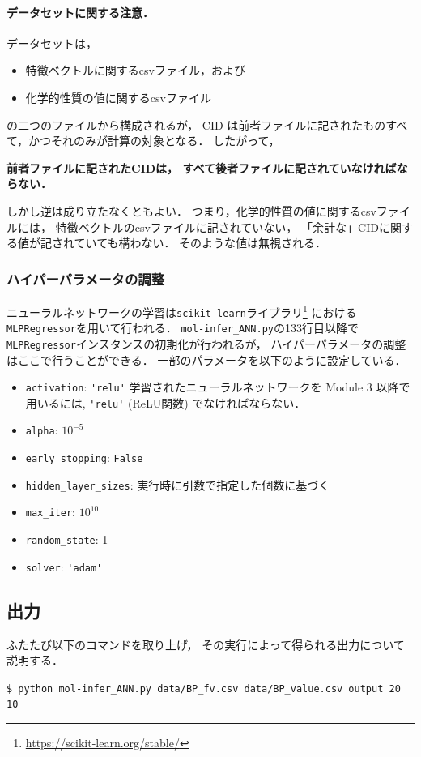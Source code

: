 \documentclass[11pt, titlepage, dvipdfmx, twoside]{jarticle}
\begin{document}
\paragraph{データセットに関する注意．}
データセットは，
\begin{itemize}
\item 特徴ベクトルに関するcsvファイル，および
\item 化学的性質の値に関するcsvファイル
\end{itemize}
の二つのファイルから構成されるが，
CID は前者ファイルに記されたものすべて，かつそれのみが計算の対象となる．
したがって，
\begin{center}
  {\bf 前者ファイルに記されたCIDは，
  すべて後者ファイルに記されていなければならない．}
\end{center}
しかし逆は成り立たなくともよい．
つまり，化学的性質の値に関するcsvファイルには，
特徴ベクトルのcsvファイルに記されていない，
「余計な」CIDに関する値が記されていても構わない．
そのような値は無視される．

\subsubsection{ハイパーパラメータの調整}
ニューラルネットワークの学習は{\tt scikit-learn}ライブラリ\footnote{\url{https://scikit-learn.org/stable/}}
における{\tt MLPRegressor}を用いて行われる．
\verb|mol-infer_ANN.py|の133行目以降で\verb|MLPRegressor|インスタンスの初期化が行われるが，
ハイパーパラメータの調整はここで行うことができる．
一部のパラメータを以下のように設定している．
\begin{itemize}
\item \verb|activation|: \verb|'relu'| {\color{red}{\bf 注意:} 学習されたニューラルネットワークを Module 3 以降で用いるには, \verb|'relu'| (ReLU関数) でなければならない．}
\item \verb|alpha|: $10^{-5}$
\item \verb|early_stopping|: \verb|False|
\item \verb|hidden_layer_sizes|: 実行時に引数で指定した個数に基づく
\item \verb|max_iter|: $10^{10}$
\item \verb|random_state|: 1
\item \verb|solver|: \verb|'adam'|
\end{itemize}

\subsection{出力}
ふたたび以下のコマンドを取り上げ，
その実行によって得られる出力について説明する．
\begin{oframed}
{\small
\verb|$ python mol-infer_ANN.py data/BP_fv.csv data/BP_value.csv output 20 10|
}
\end{oframed}
\end{document}
